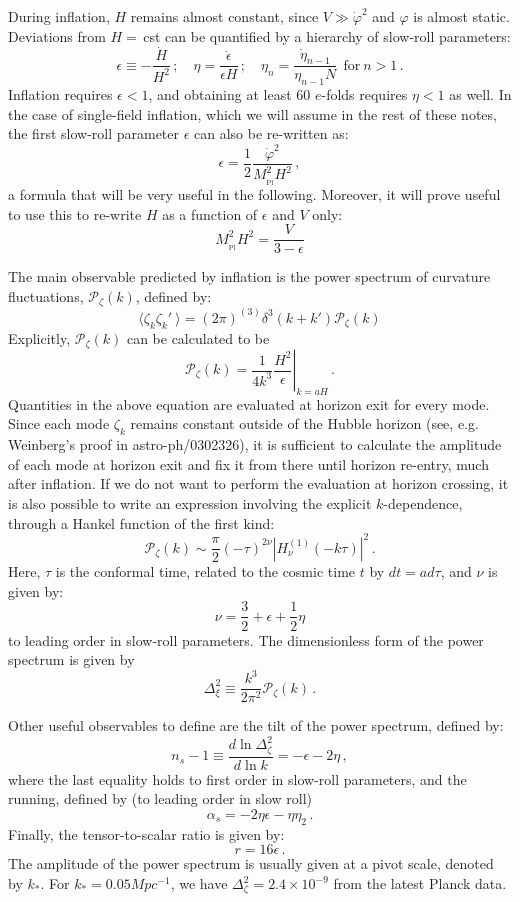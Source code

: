 \documentclass[prd, onecolumn, floatfix, letterpaper, nofootinbib, amsmath, amssymb, superscriptaddress]{revtex4}
\renewcommand{\(}{\left(}
\renewcommand{\)}{\right)}
\renewcommand{\[}{\left[}
\renewcommand{\]}{\right]}
\def\be{\begin{equation}}
\def\ee{\end{equation}}
\newcommand{\Mp}{M_{_\mathrm{Pl}}}
\begin{document}
During inflation, $H$ remains almost constant, since $V\gg\dot\varphi^2$ and $\varphi$ is almost static. Deviations from $H=\,$cst can be quantified by a hierarchy of slow-roll parameters:
\be
	\epsilon\equiv-\frac{\dot H}{H^2}\, ;\quad \eta=\frac{\dot \epsilon}{\epsilon H}\, ; \quad \eta_n=\frac{\dot{\eta}_{n-1}}{\eta_{n-1}N} ~~\mathrm{for~}n>1\, .
\ee
Inflation requires $\epsilon<1$, and obtaining at least 60 $e$-folds requires $\eta<1$ as well. In the case of single-field inflation, which we will assume in the rest of these notes, the first slow-roll parameter $\epsilon$ can also be re-written as:
\be
	\epsilon=\frac{1}{2}\frac{\dot\varphi^2}{\Mp^2H^2}\, ,
\ee
a formula that will be very useful in the following. Moreover, it will prove useful to use this to re-write $H$ as a function of $\epsilon$ and $V$ only:
\be
\label{eq:HnVrel}
	\Mp^2H^2=\frac{V}{3-\epsilon}
\ee

\bigskip 
The main observable predicted by inflation is the power spectrum of curvature fluctuations, $\mathcal{P}_\zeta (k)$, defined by:
\be
	\langle \zeta_k \zeta_k'\ \rangle=(2\pi)^{(3)}\delta^3(k+k')\mathcal{P}_\zeta(k)
\ee
Explicitly, $\mathcal{P}_\zeta (k)$ can be calculated to be
\be
	\mathcal{P}_\zeta(k)=\left.\frac{1}{4 k^3}\frac{H^2}{\epsilon}\right|_{k=aH}\, .
\ee
Quantities in the above equation are evaluated at horizon exit for every mode. Since each mode $\zeta_k$ remains constant outside of the Hubble horizon (see, e.g. Weinberg's proof in astro-ph/0302326), it is sufficient to calculate the amplitude of each mode at horizon exit and fix it from there until horizon re-entry, much after inflation.  If we do not want to perform the evaluation at horizon crossing, it is also possible to write an expression involving the explicit $k$-dependence, through a Hankel function of the first kind:
\be
	\mathcal{P}_\zeta(k)\sim \frac{\pi}{2}(-\tau)^{2\nu}\left| H^{(1)}_\nu(-k\tau)\right|^2\, .
\ee
Here, $\tau$ is the conformal time, related to the cosmic time $t$ by $dt=ad\tau$, and $\nu$ is given by:
\be
	\nu=\frac{3}{2}+\epsilon+\frac{1}{2}\eta
\ee
to leading order in slow-roll parameters. 
The dimensionless form of the power spectrum is given by
\be
	\Delta^2_\xi\equiv\frac{k^3}{2\pi^2}\mathcal{P}_\zeta(k)\,.
\ee


Other useful observables to define are the tilt of the power spectrum, defined by:
\be
	n_s-1\equiv\frac{d\ln\Delta^2_\zeta}{d\ln k}=-\epsilon-2\eta\, ,
\ee
where the last equality holds to first order in slow-roll parameters, and the running, defined by (to leading order in slow roll)
\be
	\alpha_s=-2\eta\epsilon-\eta\eta_2\, .
\ee
Finally, the tensor-to-scalar ratio is given by:
\be
	r=16\epsilon\, .
\ee
The amplitude of the power spectrum is usually given at a pivot scale, denoted by $k_*$. For $k_*=0.05Mpc^{-1}$, we have $\Delta^2_\zeta=2.4\times10^{-9}$ from the latest Planck data.
\end{document}
